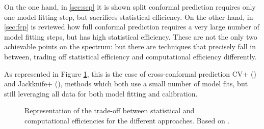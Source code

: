 On the one hand, in \ref{sec:scp} it is shown split conformal prediction requires only one model fitting step, but sacrifices statistical efficiency. On the other hand, in \ref{sec:fcp} is reviewed how full conformal prediction requires a very large number of model fitting steps, but has high statistical efficiency. These are not the only two achievable points on the spectrum: but there are techniques that precisely fall in between, trading off statistical efficiency and computational efficiency differently.

As represented in Figure \ref{fig:trade-off}, this is the case of cross-conformal prediction CV+ (\cite{vovk2015}) and Jackknife+ (\cite{barber2021b}), methods which both use a small number of model fits, but still leveraging all data for both model fitting and calibration.\\

\begin{figure}%
    \centering

    \caption{Representation of the trade-off between statistical and computational efficiencies for the different approaches. Based on \cite{cptuto}.}
    \label{fig:trade-off}
\end{figure}

